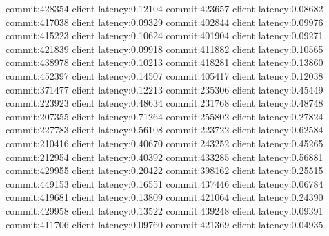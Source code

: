 commit:428354 client latency:0.12104
commit:423657 client latency:0.08682
commit:417038 client latency:0.09329
commit:402844 client latency:0.09976
commit:415223 client latency:0.10624
commit:401904 client latency:0.09271
commit:421839 client latency:0.09918
commit:411882 client latency:0.10565
commit:438978 client latency:0.10213
commit:418281 client latency:0.13860
commit:452397 client latency:0.14507
commit:405417 client latency:0.12038
commit:371477 client latency:0.12213
commit:235306 client latency:0.45449
commit:223923 client latency:0.48634
commit:231768 client latency:0.48748
commit:207355 client latency:0.71264
commit:255802 client latency:0.27824
commit:227783 client latency:0.56108
commit:223722 client latency:0.62584
commit:210416 client latency:0.40670
commit:243252 client latency:0.45265
commit:212954 client latency:0.40392
commit:433285 client latency:0.56881
commit:429955 client latency:0.20422
commit:398162 client latency:0.25515
commit:449153 client latency:0.16551
commit:437446 client latency:0.06784
commit:419681 client latency:0.13809
commit:421064 client latency:0.24390
commit:429958 client latency:0.13522
commit:439248 client latency:0.09391
commit:411706 client latency:0.09760
commit:421369 client latency:0.04935

